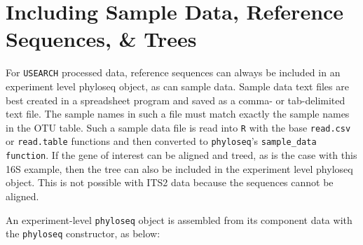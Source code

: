\documentclass{article}
\begin{document}
\section*{Including Sample Data, Reference Sequences, \& Trees}  

For \texttt{USEARCH} processed data, reference sequences can always be included in an experiment level phyloseq object, as can sample data. Sample data text files are best created in a spreadsheet program and saved as a comma- or tab-delimited text file. The sample names in such a file must match exactly the sample names in the OTU table. Such a sample data file is read into \texttt{R} with the base \texttt{read.csv} or \texttt{read.table} functions and then converted to \texttt{phyloseq}'s \texttt{sample\_data function}. If the gene of interest can be aligned and treed, as is the case with this 16S example, then the tree can also be included in the experiment level phyloseq object. This is not possible with ITS2 data because the sequences cannot be aligned.   

An experiment-level \texttt{phyloseq} object is assembled from its component data with the \texttt{phyloseq} constructor, as below:  
\end{document}
